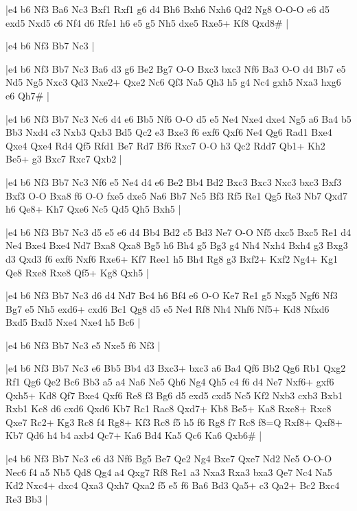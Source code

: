 \whitename{}
\blackname{}
\makegametitle
|e4 b6 Nf3 Ba6 Nc3 Bxf1 Rxf1 g6 d4 Bh6 Bxh6 Nxh6 Qd2 Ng8 O-O-O e6 d5 exd5 Nxd5 c6 Nf4 d6 Rfe1 h6 e5 g5 Nh5 dxe5 Rxe5+ Kf8 Qxd8\#  |

\whitename{}
\blackname{}
\makegametitle
|e4 b6 Nf3 Bb7 Nc3  |

\whitename{}
\blackname{}
\makegametitle
|e4 b6 Nf3 Bb7 Nc3 Ba6 d3 g6 Be2 Bg7 O-O Bxc3 bxc3 Nf6 Ba3 O-O d4 Bb7 e5 Nd5 Ng5 Nxc3 Qd3 Nxe2+ Qxe2 Nc6 Qf3 Na5 Qh3 h5 g4 Nc4 gxh5 Nxa3 hxg6 e6 Qh7\#  |

\whitename{}
\blackname{}
\makegametitle
|e4 b6 Nf3 Bb7 Nc3 Nc6 d4 e6 Bb5 Nf6 O-O d5 e5 Ne4 Nxe4 dxe4 Ng5 a6 Ba4 b5 Bb3 Nxd4 c3 Nxb3 Qxb3 Bd5 Qc2 e3 Bxe3 f6 exf6 Qxf6 Ne4 Qg6 Rad1 Bxe4 Qxe4 Qxe4 Rd4 Qf5 Rfd1 Be7 Rd7 Bf6 Rxc7 O-O h3 Qc2 Rdd7 Qb1+ Kh2 Be5+ g3 Bxc7 Rxc7 Qxb2  |

\whitename{}
\blackname{}
\makegametitle
|e4 b6 Nf3 Bb7 Nc3 Nf6 e5 Ne4 d4 e6 Be2 Bb4 Bd2 Bxc3 Bxc3 Nxc3 bxc3 Bxf3 Bxf3 O-O Bxa8 f6 O-O fxe5 dxe5 Na6 Bb7 Nc5 Bf3 Rf5 Re1 Qg5 Re3 Nb7 Qxd7 h6 Qe8+ Kh7 Qxe6 Nc5 Qd5 Qh5 Bxh5  |

\whitename{}
\blackname{}
\makegametitle
|e4 b6 Nf3 Bb7 Nc3 d5 e5 e6 d4 Bb4 Bd2 c5 Bd3 Ne7 O-O Nf5 dxc5 Bxc5 Re1 d4 Ne4 Bxe4 Bxe4 Nd7 Bxa8 Qxa8 Bg5 h6 Bh4 g5 Bg3 g4 Nh4 Nxh4 Bxh4 g3 Bxg3 d3 Qxd3 f6 exf6 Nxf6 Rxe6+ Kf7 Ree1 h5 Bh4 Rg8 g3 Bxf2+ Kxf2 Ng4+ Kg1 Qe8 Rxe8 Rxe8 Qf5+ Kg8 Qxh5  |

\whitename{}
\blackname{}
\makegametitle
|e4 b6 Nf3 Bb7 Nc3 d6 d4 Nd7 Bc4 h6 Bf4 e6 O-O Ke7 Re1 g5 Nxg5 Ngf6 Nf3 Bg7 e5 Nh5 exd6+ cxd6 Bc1 Qg8 d5 e5 Ne4 Rf8 Nh4 Nhf6 Nf5+ Kd8 Nfxd6 Bxd5 Bxd5 Nxe4 Nxe4 h5 Bc6  |

\whitename{}
\blackname{}
\makegametitle
|e4 b6 Nf3 Bb7 Nc3 e5 Nxe5 f6 Nf3  |

\whitename{}
\blackname{}
\makegametitle
|e4 b6 Nf3 Bb7 Nc3 e6 Bb5 Bb4 d3 Bxc3+ bxc3 a6 Ba4 Qf6 Bb2 Qg6 Rb1 Qxg2 Rf1 Qg6 Qe2 Bc6 Bb3 a5 a4 Na6 Ne5 Qh6 Ng4 Qh5 c4 f6 d4 Ne7 Nxf6+ gxf6 Qxh5+ Kd8 Qf7 Bxe4 Qxf6 Re8 f3 Bg6 d5 exd5 cxd5 Nc5 Kf2 Nxb3 cxb3 Bxb1 Rxb1 Kc8 d6 cxd6 Qxd6 Kb7 Rc1 Rac8 Qxd7+ Kb8 Be5+ Ka8 Rxc8+ Rxc8 Qxe7 Rc2+ Kg3 Rc8 f4 Rg8+ Kf3 Rc8 f5 h5 f6 Rg8 f7 Rc8 f8=Q Rxf8+ Qxf8+ Kb7 Qd6 h4 b4 axb4 Qc7+ Ka6 Bd4 Ka5 Qc6 Ka6 Qxb6\#  |

\whitename{}
\blackname{}
\makegametitle
|e4 b6 Nf3 Bb7 Nc3 e6 d3 Nf6 Bg5 Be7 Qe2 Ng4 Bxe7 Qxe7 Nd2 Ne5 O-O-O Nec6 f4 a5 Nb5 Qd8 Qg4 a4 Qxg7 Rf8 Re1 a3 Nxa3 Rxa3 bxa3 Qe7 Nc4 Na5 Kd2 Nxc4+ dxc4 Qxa3 Qxh7 Qxa2 f5 e5 f6 Ba6 Bd3 Qa5+ c3 Qa2+ Bc2 Bxc4 Re3 Bb3  |

